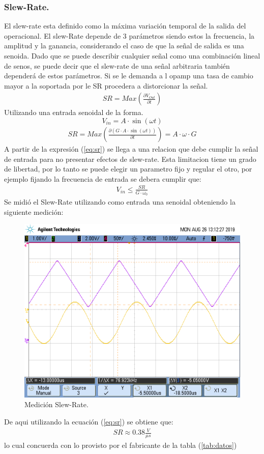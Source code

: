\subsubsection{Slew-Rate.}
El slew-rate esta definido como la máxima variación temporal de la salida del operacional. El slew-Rate depende de 3 parámetros siendo estos la frecuencia, la amplitud y la ganancia, considerando el caso de que la señal de salida es una senoida. Dado que se puede describir cualquier señal como una combinación lineal de senos, se puede decir que el slew-rate de una señal arbitraria también dependerá de estos parámetros.
Si se le demanda a l opamp una tasa de cambio mayor a la soportada por le SR procedera a distorcionar la señal.
\begin{align}  SR= Max\left( \frac{\partial V_{Out}}{\partial t}\right)  \end{align}
Utilizando una entrada senoidal de la forma.
$$V_{in}=A\cdot \sin (\omega t)$$
\begin{align}   SR= Max\left( \frac{\partial (G\cdot A\cdot \sin (\omega t))}{\partial t}\right) = A \cdot \omega \cdot G  
\label{eq:sr}
\end{align}
A partir de la expresión  (\ref{eq:sr}) se llega a una relacion que debe cumplir la señal de entrada para no presentar efectos de slew-rate. Esta limitacion tiene un grado de libertad, por lo tanto se puede elegir un parametro fijo y regular el otro, por ejemplo fijando la frecuencia de entrada se debera cumplir que:
\begin{align} V_{in}	\leq \frac{SR}{G\cdot \omega_0}\end{align}
Se midió el Slew-Rate  utilizando como entrada una senoidal obteniendo la siguiente medición:
\begin{figure}[H]	
	\centering
	\includegraphics[width=\textwidth]{Ejercicio1/Imagenes/slew_rate1.png}
	\caption{Medición Slew-Rate.}
	\label{fig:SlewRate}
\end{figure}
De aqui utilizando la ecuación (\ref{eq:sr}) se obtiene que:
\begin{align}
SR \approx  0.38 \frac{V}{\mu s}
\end{align}
lo cual concuerda con lo provisto por el fabricante de la tabla (\ref{tab:datos})
